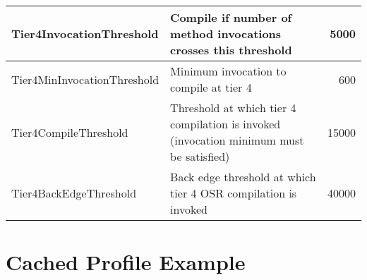 \begin{table}[h]
\begin{center}
\begin{tabular}{| l | p{9.0cm} | r | }
       Tier4InvocationThreshold & Compile if number of method invocations crosses this threshold & 5000 \\ \hline
       Tier4MinInvocationThreshold & Minimum invocation to compile at tier 4 & 600 \\ \hline
       Tier4CompileThreshold & Threshold at which tier 4 compilation is invoked (invocation minimum must be satisfied) & 15000 \\ \hline
       Tier4BackEdgeThreshold & Back edge threshold at which tier 4 OSR compilation is invoked & 40000 \\ \hline
    \end{tabular}
  \end{center}
\end{table}
\newpage
\section{Cached Profile Example}
\label{a:cacheprofileexample}
